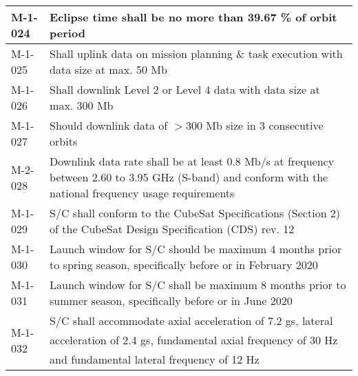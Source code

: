 \begin{table*}[htbp]
\begin{tabular}{l p{15cm}}
			\hline
			M-1-024 & Eclipse time shall be no more than 39.67 \% of orbit period \\
			\hline
			M-1-025  & Shall uplink data on mission planning \& task execution with data size at max. 50 Mb \\
     \hline
			M-1-026 & Shall downlink Level 2 or Level 4 data with data size at max. 300 Mb \\
			\hline 
			M-1-027  & Should downlink data of $>300$ Mb size in 3 consecutive orbits\\
			\hline
			M-2-028 & Downlink data rate shall be at least 0.8 Mb/s at frequency between 2.60 to 3.95 GHz (S-band) and conform with the national frequency usage requirements \\
			\hline
			M-1-029 & S/C shall conform to the CubeSat Specifications (Section 2) of the CubeSat Design Specification (CDS) rev. 12 \\
			\hline
			M-1-030 & Launch window for S/C should be maximum 4 months prior to spring season, specifically before or in February 2020 \\ 
			\hline
			M-1-031 & Launch window for S/C shall be maximum 8 months prior to summer season, specifically before or in June 2020  \\ 
			\hline
			M-1-032 & S/C shall accommodate axial acceleration of 7.2 gs, lateral acceleration of 2.4 gs, fundamental axial frequency of 30 Hz and fundamental lateral frequency of 12 Hz \\
			\hline
		\end{tabular}
\end{table*}

